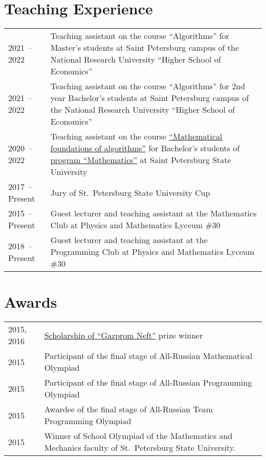 \documentclass[a4paper, 11pt]{article}
\begin{document}
\section*{Teaching Experience}

\begin{tabularx}{\textwidth}{lX}
	2021~-- 2022 & Teaching assistant on the course ``Algorithms'' for Master's students at Saint Petersburg campus of the National Research University ``Higher School of Economics''  \\

	2021~-- 2022 & Teaching assistant on the course ``Algorithms'' for 2nd year Bachelor's students at Saint Petersburg campus of the National Research University ``Higher School of Economics''  \\

	2020~-- 2022 & Teaching assistant on the course \href{https://users.math-cs.spbu.ru/~okhotin/teaching/algorithms_2020/}{``Mathematical foundations of algorithms''} for Bachelor's students of \href{https://math-cs.spbu.ru/en/}{program ``Mathematics''} at Saint Petersburg State University \\

	2017~-- Present & Jury of St.~Petersburg State University Cup \\

	2015~-- Present & Guest lecturer and teaching assistant at the Mathematics Club at Physics and Mathematics Lyceum \#30 \\

	2018~-- Present & Guest lecturer and teaching assistant at the Programming Club at Physics and Mathematics Lyceum \#30
\end{tabularx}

\section*{Awards}

\begin{tabularx}{\textwidth}{lX}
	2015, 2016 & \href{https://math-cs.spbu.ru/en/scholarships-rodnye-goroda/}{Scholarship of ``Gazprom Neft''} prize winner \\

	2015 & Participant of the final stage of All-Russian Mathematical Olympiad \\

	2015 & Participant of the final stage of All-Russian Programming Olympiad \\

	2015 & Awardee of the final stage of All-Russian Team Programming Olympiad \\

	2015 & Winner of School Olympiad of the Mathematics and Mechanics faculty of St.~Petersburg State University.
\end{tabularx}
\end{document}

